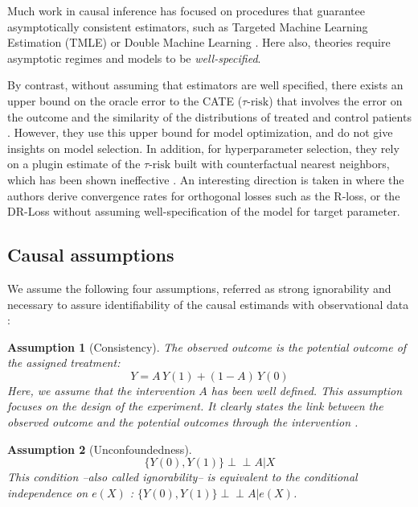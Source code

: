 \documentclass[a4paper,num-refs]{oup-contemporary}%
\newtheorem{assumption}{Assumption}
\newcommand{\indep}{\perp \!\!\! \perp}
\begin{document}
Much work in causal inference has focused on procedures that
guarantee asymptotically consistent estimators, such as Targeted
Machine Learning
Estimation (TMLE) \cite{laan_targeted_2011,schuler_targeted_2017} or
Double Machine Learning \cite{chernozhukov_double_2018}. Here also, theories require asymptotic regimes and
models to be \textit{well-specified}.

By contrast, without assuming that estimators are well specified, there exists an upper bound
on the oracle error to the CATE ($\tau\text{-risk}$) that involves the error on
the outcome and the similarity of the distributions of treated and control
patients \cite{johansson2022generalization}. However, they use this upper bound for model optimization,
and do not give insights on model selection. In addition, for hyperparameter
selection, they rely on a plugin estimate of the $\tau\text{-risk}$ built with
counterfactual nearest neighbors, which has been shown ineffective
\cite{schuler_comparison_2018}. An interesting direction is taken in \cite{foster2023orthogonal} where the authors derive convergence rates for orthogonal losses such as the R-loss, or the DR-Loss without assuming well-specification of the model for target parameter.


\subsection{Causal assumptions}\label{apd:causal_assumptions}

We assume the following four assumptions, referred as strong ignorability and
necessary to assure identifiability of the causal estimands with observational
data \cite{rubin_causal_2005}:
\begin{assumption}[Consistency]\label{assumption:consistency} The observed
    outcome is the potential outcome of the assigned treatment:
    \begin{equation*}\label{eq:consistancy}
        Y = A \, Y(1) + (1-A) \, Y(0)
    \end{equation*}
    Here, we assume that the intervention $A$ has been well defined. This
    assumption focuses on the design of the experiment. It clearly states the link
    between the observed outcome and the potential outcomes through the
    intervention \cite{hernan_causal_2020}.
\end{assumption}

\begin{assumption}[Unconfoundedness]\label{assumption:ignorability}
    \begin{equation*}\label{eq:ignorability}
        \{Y(0), Y(1) \} \indep A | X
    \end{equation*}
    This condition --also called ignorability-- is equivalent to the conditional
    independence on $e(X)$ \cite{rosenbaum_central_1983}: $\{Y(0), Y(1) \}
        \indep  A | e(X)$.
\end{assumption}
\end{document}
